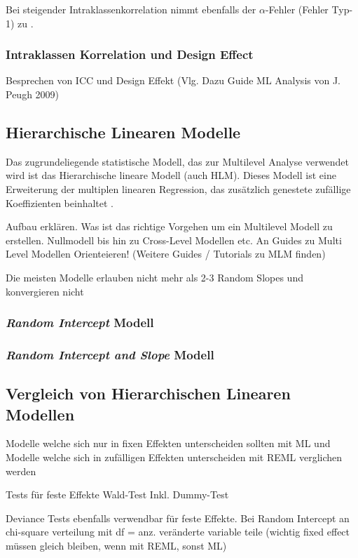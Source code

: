 \documentclass[12pt]{article}\usepackage[]{graphicx}\usepackage[]{color}
\begin{document}
Bei steigender Intraklassenkorrelation nimmt ebenfalls der $\alpha$-Fehler (Fehler Typ-1) zu \cite{dorman2008effect}.

\subsubsection{Intraklassen Korrelation und Design Effect}
Besprechen von ICC und Design Effekt (Vlg. Dazu Guide ML Analysis von J. Peugh 2009)


\subsection{Hierarchische Linearen Modelle}
Das zugrundeliegende statistische Modell, das zur Multilevel Analyse verwendet wird ist das Hierarchische lineare Modell (auch HLM). Dieses Modell ist eine Erweiterung der multiplen linearen Regression, das zusätzlich genestete zufällige Koeffizienten beinhaltet \cite{SnijdersTomA.B2012Ma:a}.

Aufbau erklären. Was ist das richtige Vorgehen um ein Multilevel Modell zu erstellen. Nullmodell bis hin zu Cross-Level Modellen etc. An Guides zu Multi Level Modellen Orienteieren! \cite{SnijdersTomA.B2012Ma:a} (Weitere Guides / Tutorials zu MLM finden)

Die meisten Modelle erlauben nicht mehr als 2-3 Random Slopes und konvergieren nicht \cite{SnijdersTomA.B2012Ma:a}

\subsubsection{\textit{Random Intercept} Modell}
\subsubsection{\textit{Random Intercept and Slope} Modell}

\subsection{Vergleich von Hierarchischen Linearen Modellen}
Modelle welche sich nur in fixen Effekten unterscheiden sollten mit ML und Modelle welche sich in zufälligen Effekten unterscheiden mit REML verglichen werden \cite{SnijdersTomA.B2012Ma:a}

Tests für feste Effekte Wald-Test \cite{SnijdersTomA.B2012Ma:a} Inkl. Dummy-Test

Deviance Tests ebenfalls verwendbar für feste Effekte. Bei Random Intercept an chi-square verteilung mit df = anz. veränderte variable teile (wichtig fixed effect müssen gleich bleiben, wenn mit REML, sonst ML)
\end{document}
